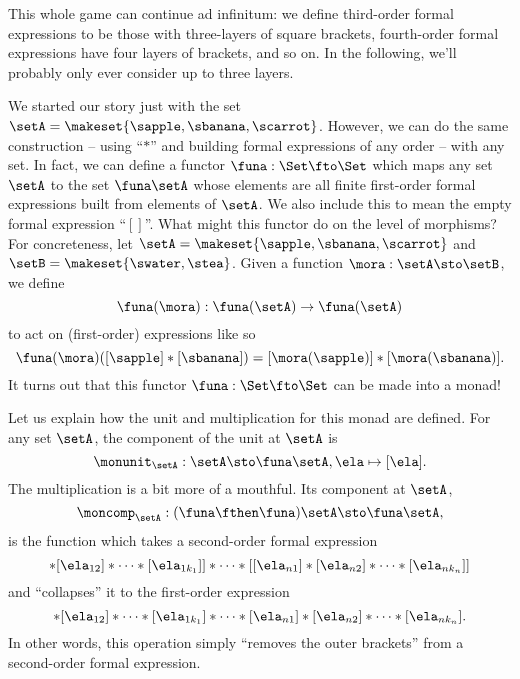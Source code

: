 This whole game can continue ad infinitum: we define third-order formal expressions to be those with three-layers of square brackets, fourth-order formal expressions have four layers of brackets, and so on.
In the following, we'll probably only ever consider up to three layers.

We started our story just with the set $\setA = \makeset{ \sapple, \sbanana, \scarrot }$.
However, we can do the same construction -- using ``$*$'' and building formal expressions of any order -- with any set.
In fact, we can define a functor $\funa: \Set \fto \Set$ which maps any set $\setA$ to the set $\funa \setA$ whose elements are all finite first-order formal expressions built from elements of $\setA$.
We also include this to mean the empty formal expression ``$[ ]$''.
What might this functor do on the level of morphisms?
For concreteness, let $\setA = \makeset{ \sapple, \sbanana, \scarrot } $ and $\setB = \makeset{ \swater, \stea }$.
Given a function $\mora: \setA \sto \setB$, we define
\begin{equation}
    \funa(\mora) : \funa(\setA) \to \funa(\setA)
\end{equation}
to act on (first-order) expressions like so
\begin{equation}
    \funa(\mora)([\sapple]*[\sbanana]) = [\mora(\sapple)]*[\mora(\sbanana)].
\end{equation}
It turns out that this functor $\funa: \Set \fto \Set$ can be made into a monad!

Let us explain how the unit and multiplication for this monad are defined.
For any set $\setA$, the component of the unit at $\setA$ is
\begin{equation}
    \monunit_\setA : \setA \sto \funa \setA, \ela \mapsto [\ela].
\end{equation}
The multiplication is a bit more of a mouthful.
Its component at $\setA$,
\begin{equation}
    \moncomp_\setA : (\funa \fthen \funa)\setA \sto \funa \setA,
\end{equation}
is the function which takes a second-order formal expression
\begin{equation}
    [[\ela_{11}]* [\ela_{12}] * \cdots * [\ela_{1k_1}]] * \cdots * [[\ela_{n1}]* [\ela_{n2}] * \cdots * [\ela_{nk_n}]]
\end{equation}
and ``collapses'' it to the first-order expression
\begin{equation}
    [\ela_{11}]
    * [\ela_{12}] * \cdots * [\ela_{1k_1}] * \cdots * [\ela_{n1}]* [\ela_{n2}] * \cdots * [\ela_{nk_n}].
\end{equation}
In other words, this operation simply ``removes the outer brackets'' from a second-order formal expression.

